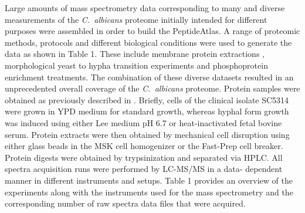 Large amounts of mass spectrometry data corresponding to
many and diverse measurements of the \textit{\mbox{C. albicans}} proteome
initially intended for different purposes were assembled in order
to build the PeptideAtlas. A range of proteomic methods,
protocols and different biological conditions were used to
generate the data as shown in Table 1. These include membrane
protein extractions \citep{Cabezon2009}, morphological yeast to hypha transition
experiments \citep{Monteoliva2010} and phosphoprotein enrichment treatments.
The combination of these diverse datasets resulted in an
unprecedented overall coverage of the \textit{\mbox{C. albicans}} proteome.
Protein samples were obtained as previously described in \citep{Monteoliva2010}.
Briefly, cells of the clinical isolate SC5314 were grown in YPD
medium for standard growth, whereas hyphal form growth was
induced using either Lee medium pH 6.7 or heat-inactivated
fetal bovine serum. Protein extracts were then obtained by
mechanical cell disruption using either glass beads in the MSK
cell homogenizer or the Fast-Prep cell breaker. Protein digests
were obtained by trypsinization and separated via HPLC. All
spectra acquisition runs were performed by LC-MS/MS in a data-
dependent manner in different instruments and setups. Table 1
provides an overview of the experiments along with the
instruments used for the mass spectrometry and the corresponding
 number of raw spectra data files that were acquired.
 


